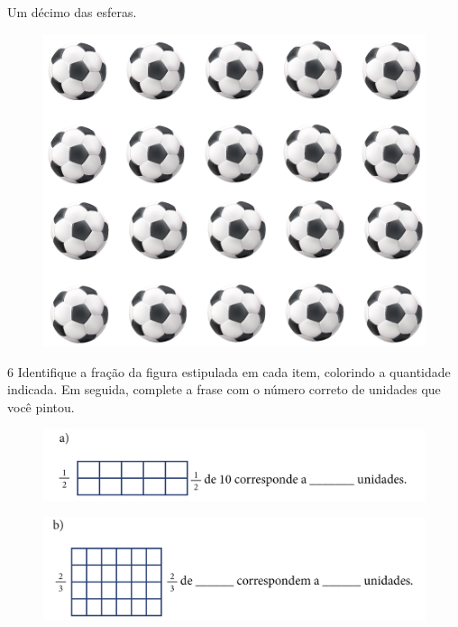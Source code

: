 \begin{escolha}

\item
  Um décimo das esferas.

\begin{figure}[htpb!]
\includegraphics[width=\textwidth]{../ilustracoes/MAT5/SAEB_5ANO_MAT_figura73.png}
\end{figure}


\end{escolha}


\num{6} Identifique a fração da figura estipulada em cada item, colorindo a
quantidade indicada. Em seguida, complete a frase com o número correto de unidades que você pintou.

\begin{figure}[htpb!]
\includegraphics[width=.8\textwidth]{../ilustracoes/MAT5/SAEB_5ANO_MAT_figura74-1.png}
\end{figure}


\begin{figure}[htpb!]
\includegraphics[width=.8\textwidth]{../ilustracoes/MAT5/SAEB_5ANO_MAT_figura74-2.png}
\end{figure}

